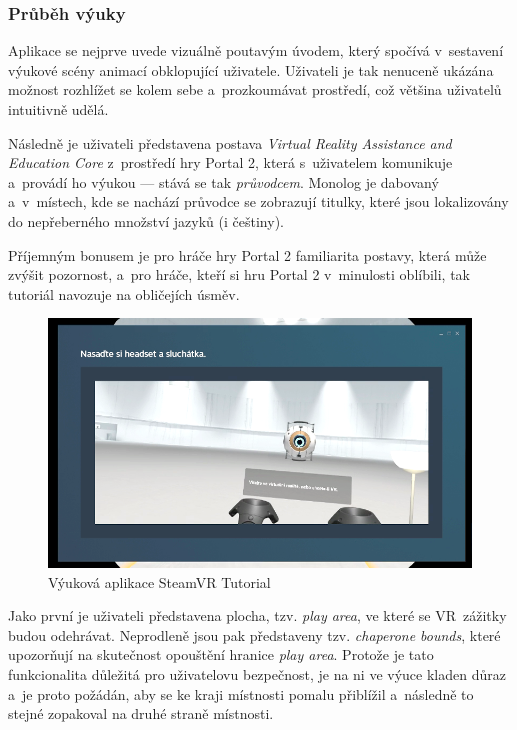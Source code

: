 \subsubsection{Průběh výuky}\label{prux16fbux11bh-vuxfduky}

Aplikace se nejprve uvede vizuálně poutavým úvodem, který spočívá
v~sestavení výukové scény animací obklopující uživatele. Uživateli je tak nenuceně
ukázána možnost rozhlížet se kolem sebe a~prozkoumávat prostředí, což
většina uživatelů intuitivně udělá.

Následně je uživateli představena postava \emph{Virtual Reality
Assistance and Education Core} z~prostředí hry Portal 2, která s~uživatelem
komunikuje a~provádí ho výukou --- stává se tak \emph{průvodcem}. Monolog
je dabovaný a~v~místech, kde se nachází průvodce se zobrazují titulky,
které jsou lokalizovány do nepřeberného množství jazyků (i češtiny).

Příjemným bonusem je pro hráče hry Portal 2 familiarita postavy, která
může zvýšit pozornost, a~pro hráče, kteří si hru Portal 2
v~minulosti oblíbili, tak tutoriál navozuje na obličejích úsměv.

\begin{figure}[h!]
\centering
\includegraphics[width=12cm]{src/assets/steamvr-tutorial.png}
\caption{Výuková aplikace SteamVR Tutorial}
\end{figure}

Jako první je uživateli představena plocha, tzv. \emph{play area}, ve
které se VR~zážitky budou odehrávat. Neprodleně jsou pak představeny
tzv. \emph{chaperone bounds}, které upozorňují na skutečnost opouštění 
hranice \emph{play area}. Protože je tato funkcionalita
důležitá pro uživatelovu bezpečnost, je na ni ve výuce kladen důraz a~je proto
požádán, aby se ke kraji místnosti pomalu přiblížil a~následně to stejné
zopakoval na druhé straně místnosti.

